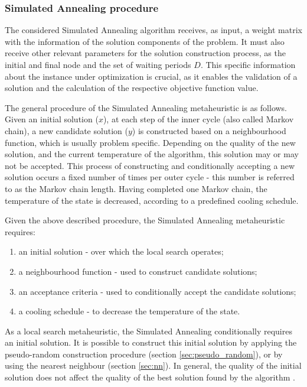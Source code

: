 \subsubsection{Simulated Annealing procedure}
\label{sec:sa}

The considered Simulated Annealing algorithm receives, as input, a weight matrix with the information of the solution components of the problem. It must also receive other relevant parameters for the solution construction process, as the initial and final node and the set of waiting periods $D$. This specific information about the instance under optimization is crucial, as it enables the validation of a solution and the calculation of the respective objective function value.

The general procedure of the Simulated Annealing metaheuristic is as follows. Given an initial solution ($x$), at each step of the inner cycle (also called Markov chain), a new candidate solution ($y$) is constructed based on a neighbourhood function, which is usually problem specific. Depending on the quality of the new solution, and the current temperature of the algorithm, this solution may or may not be accepted. This process of constructing and conditionally accepting a new solution occurs a fixed number of times per outer cycle - this number is referred to as the Markov chain length. Having completed one Markov chain, the temperature of the state is decreased, according to a predefined cooling schedule.

Given the above described procedure, the Simulated Annealing metaheuristic requires:
\begin{enumerate}[noitemsep,topsep=5pt,parsep=1pt,partopsep=1pt]
    \item an initial solution - over which the local search operates;
    \item a neighbourhood function - used to construct candidate solutions; 
    \item an acceptance criteria - used to conditionally accept the candidate solutions;
    \item a cooling schedule - to decrease the temperature of the state.
\end{enumerate}


As a local search metaheuristic, the Simulated Annealing conditionally requires an initial solution.  It is possible to construct this initial solution by applying the pseudo-random construction procedure (section \ref{sec:pseudo_random}), or by using the nearest neighbour (section \ref{sec:nn}). In general, the quality of the initial solution does not affect the quality of the best solution found by the algorithm \cite{sa_initial_solution}.

